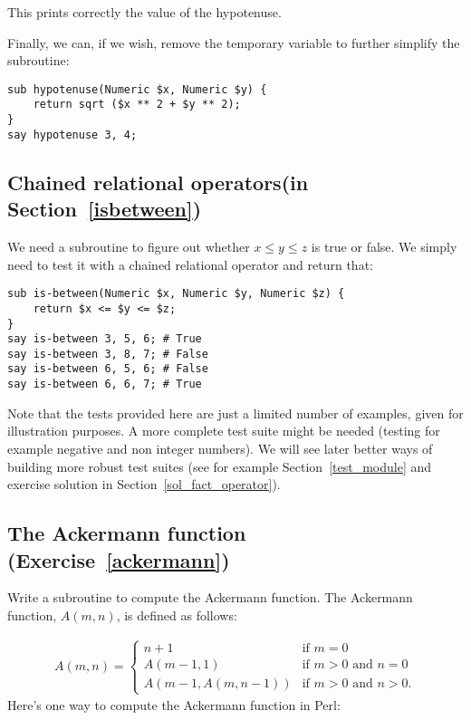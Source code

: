 This prints correctly the value of the hypotenuse.

Finally, we can, if we wish, remove the temporary variable 
to further simplify the subroutine:
\begin{verbatim}
sub hypotenuse(Numeric $x, Numeric $y) {
    return sqrt ($x ** 2 + $y ** 2);
}
say hypotenuse 3, 4;
\end{verbatim}
%

\subsection{Chained relational operators(in Section~\ref{isbetween})}
\label{sol_isbetween}

We need a subroutine to figure out whether $x \le y \le z$ 
is true or false. We simply need to test it with a chained relational operator and return that:

\begin{verbatim}
sub is-between(Numeric $x, Numeric $y, Numeric $z) {
    return $x <= $y <= $z;
}
say is-between 3, 5, 6; # True
say is-between 3, 8, 7; # False
say is-between 6, 5, 6; # False
say is-between 6, 6, 7; # True
\end{verbatim}
%

Note that the tests provided here are just a limited number of 
examples, given for illustration purposes. A more complete test 
suite might be needed (testing for example negative and non 
integer numbers). We will see later better ways 
of building more robust test suites (see for example 
Section~\ref{test_module} and exercise 
solution in Section~\ref{sol_fact_operator}).


\subsection{The Ackermann function (Exercise~\ref{ackermann})}
\label{sol_ackermann}

Write a subroutine to compute the Ackermann function. The Ackermann function, $A(m, n)$, is defined as follows:

\begin{eqnarray*}
A(m, n) = \begin{cases} 
              n+1 & \mbox{if } m = 0 \\ 
        A(m-1, 1) & \mbox{if } m > 0 \mbox{ and } n = 0 \\ 
A(m-1, A(m, n-1)) & \mbox{if } m > 0 \mbox{ and } n > 0.
\end{cases} 
\end{eqnarray*}
%
Here's one way to compute the Ackermann function in Perl:

